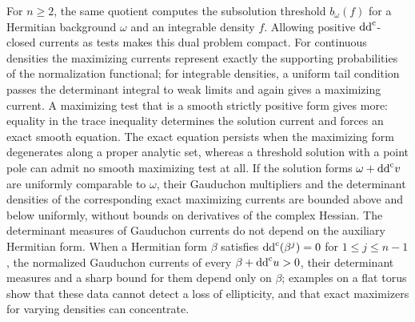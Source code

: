For $n\geq2$, the same quotient computes the subsolution threshold $b_\omega(f)$ for a Hermitian background $\omega$ and an integrable density $f$. Allowing positive $\mathrm{dd}^{\mathrm{c}}$-closed currents as tests makes this dual problem compact. For continuous densities the maximizing currents represent exactly the supporting probabilities of the normalization functional; for integrable densities, a uniform tail condition passes the determinant integral to weak limits and again gives a maximizing current. A maximizing test that is a smooth strictly positive form gives more: equality in the trace inequality determines the solution current and forces an exact smooth equation. The exact equation persists when the maximizing form degenerates along a proper analytic set, whereas a threshold solution with a point pole can admit no smooth maximizing test at all. If the solution forms $\omega+\mathrm{dd}^{\mathrm{c}} v$ are uniformly comparable to $\omega$, their Gauduchon multipliers and the determinant densities of the corresponding exact maximizing currents are bounded above and below uniformly, without bounds on derivatives of the complex Hessian. The determinant measures of Gauduchon currents do not depend on the auxiliary Hermitian form. When a Hermitian form $\beta$ satisfies $\mathrm{dd}^{\mathrm{c}}(\beta^j)=0$ for $1\leq j\leq n-1$, the normalized Gauduchon currents of every $\beta+\mathrm{dd}^{\mathrm{c}} u>0$, their determinant measures and a sharp bound for them depend only on $\beta$; examples on a flat torus show that these data cannot detect a loss of ellipticity, and that exact maximizers for varying densities can concentrate.

